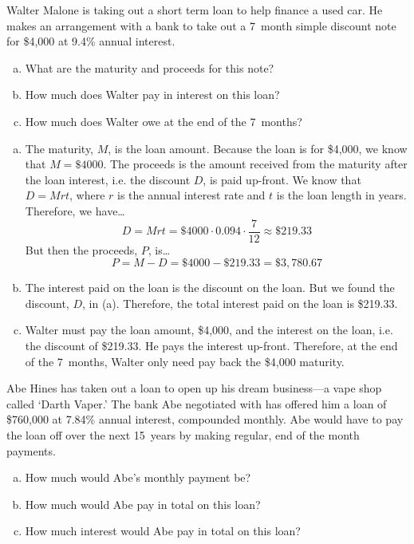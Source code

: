 \documentclass[12pt,letterpaper]{exam}
\begin{document}
\begin{questions}
\newpage
\question[10] Walter Malone is taking out a short term loan to help finance a used car. He makes an arrangement with a bank to take out a 7~month simple discount note for \$4,000 at 9.4\% annual interest. 
	\begin{enumerate}[(a)]
	\item What are the maturity and proceeds for this note?
	\item How much does Walter pay in interest on this loan?
	\item How much does Walter owe at the end of the 7~months?
	\end{enumerate} \pspace

{\itshape
\sol
\begin{enumerate}[(a)]
\item The maturity, $M$, is the loan amount. Because the loan is for \$4,000, we know that $M= \$4000$. The proceeds is the amount received from the maturity after the loan interest, i.e. the discount $D$, is paid up-front. We know that $D= Mrt$, where $r$ is the annual interest rate and $t$ is the loan length in years. Therefore, we have\dots
	\[
	D= Mrt= \$4000 \cdot 0.094 \cdot \dfrac{7}{12} \approx \$219.33
	\]
But then the proceeds, $P$, is\dots
	\[
	P= M - D= \$4000 - \$219.33= \$3,\!780.67
	\]

\item The interest paid on the loan is the discount on the loan. But we found the discount, $D$, in (a). Therefore, the total interest paid on the loan is \$219.33. \pspace 

\item Walter must pay the loan amount, \$4,000, and the interest on the loan, i.e. the discount of \$219.33. He pays the interest up-front. Therefore, at the end of the 7~months, Walter only need pay back the \$4,000 maturity. 
\end{enumerate}
}



\newpage
\question[10] Abe Hines has taken out a loan to open up his dream business---a vape shop called `Darth Vaper.' The bank Abe negotiated with has offered him a loan of \$760,000 at 7.84\% annual interest, compounded monthly. Abe would have to pay the loan off over the next 15~years by making regular, end of the month payments.
	\begin{enumerate}[(a)]
	\item How much would Abe's monthly payment be?
	\item How much would Abe pay in total on this loan?
	\item How much interest would Abe pay in total on this loan?
	\end{enumerate} \pspace


\end{questions}
\end{document}
